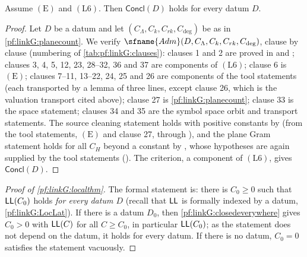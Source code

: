 \begin{proposition}\label{pf:linkG:closedeverywhere}
Assume $(\mathrm E)$ and $(\mathrm L6)$. Then $\mathsf{Concl}(D)$ holds for every datum $D$.
\end{proposition}

\begin{proof}
Let $D$ be a datum and let $(C_\Lambda,C_k,C_{rk},C_{\deg})$ be as in \cref{pf:linkG:planecount}. We verify
$\sfname{Adm}(D,C_\Lambda,C_k,C_{rk},C_{\deg})$, clause by clause (numbering of \cref{tab:pf:linkG:clauses}):
clauses 1 and 2 are proved in
 and ;
clauses 3, 4, 5, 12, 23, 28--32, 36 and 37 are components of $(\mathrm L6)$; clause 6 is $(\mathrm E)$; clauses 7--11, 13--22,
24, 25 and 26 are components of the tool statements (each transported by a lemma of three lines, except clause 26,
which is the valuation transport cited above); clause 27 is \cref{pf:linkG:planecount}; clause 33 is the space statement;
clauses 34 and 35 are the symbol space orbit and transport statements. The source cleaning statement holds with
positive constants by  (from the tool statements,
$(\mathrm E)$ and clause 27, through ), and the
plane Gram statement holds for all $C_H$ beyond a constant by , whose
hypotheses are again supplied by the tool statements
(). The criterion, a component of $(\mathrm L6)$, gives
$\mathsf{Concl}(D)$.
\end{proof}

\begin{proof}[Proof of \cref{pf:linkG:localthm}]
The formal statement is: there is $C_0\ge0$ such that $\mathsf{LL}(C_0)$ holds \emph{for every datum $D$} (recall that
$\mathsf{LL}$ is formally indexed by a datum, \cref{pf:linkG:LocLat}). If there is a datum $D_0$, then
\cref{pf:linkG:closedeverywhere} gives $C_0>0$ with $\mathsf{LL}(C)$ for all $C\ge C_0$, in particular $\mathsf{LL}(C_0)$; as
the statement does not depend on the datum, it holds for every datum. If there is no datum, $C_0=0$ satisfies the
statement vacuously.
\end{proof}

